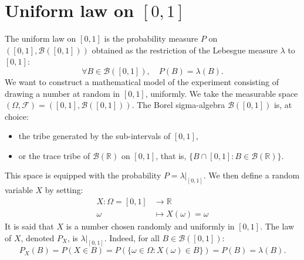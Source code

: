 \section{Uniform law on $[0,1]$}
The uniform law on $[0,1]$ is the probability measure $P$ on $([0,1], \mathcal{B}([0,1]))$ obtained as the restriction of the Lebesgue measure $\lambda$ to $[0,1]$:
\[
\forall B \in \mathcal{B}([0,1]), \quad P(B) = \lambda(B).
\]
We want to construct a mathematical model of the experiment consisting of drawing a number at random in $[0,1]$, uniformly.
We take the measurable space $(\Omega, \mathcal{F}) = ([0,1], \mathcal{B}([0,1]))$. The Borel sigma-algebra $\mathcal{B}([0,1])$ is, at choice:%
\begin{itemize}
    \item  the tribe generated by the sub-intervals of $[0,1]$,
\item  or the trace tribe of $\mathcal{B}(\mathbb{R})$ on $[0,1]$, that is, $\{B \cap [0,1] : B \in \mathcal{B}(\mathbb{R})\}$.
\end{itemize}%
This space is equipped with the probability $P = \lambda|_{[0,1]}$.
We then define a random variable $X$ by setting:%
\begin{align*}
    X: \Omega = [0,1] &\to \mathbb{R} \\
    \omega &\mapsto X(\omega) = \omega
\end{align*}%
It is said that $X$ is a number chosen randomly and uniformly in $[0,1]$.
The law of $X$, denoted $P_X$, is $\lambda|_{[0,1]}$. Indeed, for all $B \in \mathcal{B}([0,1])$:
\[
P_X(B) = P(X \in B) = P(\{\omega \in \Omega : X(\omega) \in B\}) = P(B) = \lambda(B).
\]%
